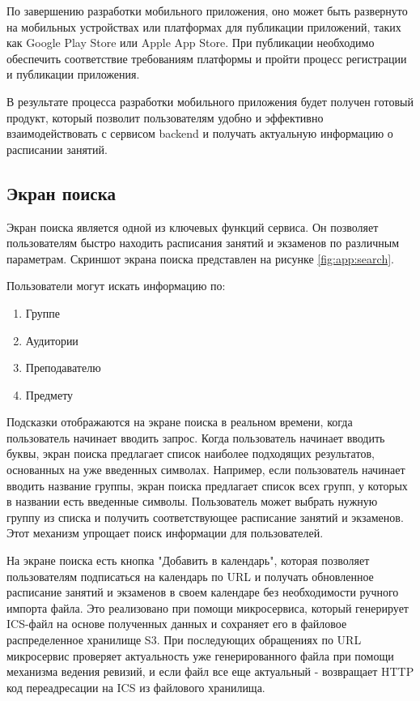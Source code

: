 По завершению разработки мобильного приложения, оно может быть развернуто на мобильных устройствах или платформах для публикации приложений, 
таких как Google Play Store или Apple App Store. При публикации необходимо обеспечить 
соответствие требованиям платформы и пройти процесс регистрации и публикации приложения.

В результате процесса разработки мобильного приложения будет получен готовый продукт, 
который позволит пользователям удобно и эффективно взаимодействовать с сервисом backend 
и получать актуальную информацию о расписании занятий.

\subsection{Экран поиска}
Экран поиска является одной из ключевых функций сервиса.
Он позволяет пользователям быстро находить расписания занятий и экзаменов по различным параметрам.
Скриншот экрана поиска представлен на рисунке \ref{fig:app:search}.

Пользователи могут искать информацию по:
\begin{enumerate}
    \item Группе
    \item Аудитории
    \item Преподавателю
    \item Предмету
\end{enumerate}

Подсказки отображаются на экране поиска в реальном времени, когда пользователь начинает вводить запрос.
Когда пользователь начинает вводить буквы, экран поиска предлагает список наиболее подходящих результатов,
основанных на уже введенных символах.
Например, если пользователь начинает вводить название группы,
экран поиска предлагает список всех групп, у которых в названии есть введенные символы.
Пользователь может выбрать нужную группу из списка и получить соответствующее расписание занятий и экзаменов.
Этот механизм упрощает поиск информации для пользователей.

На экране поиска есть кнопка "Добавить в календарь",
которая позволяет пользователям подписаться на календарь по URL
и получать обновленное расписание занятий и экзаменов
в своем календаре без необходимости ручного импорта файла.
Это реализовано при помощи микросервиса, который генерирует ICS-файл
на основе полученных данных и сохраняет его в файловое распределенное хранилище S3.
При последующих обращениях по URL микросервис проверяет актуальность
уже генерированного файла при помощи механизма ведения ревизий,
и если файл все еще актуальный - возвращает HTTP код переадресации на ICS из файлового хранилища.

